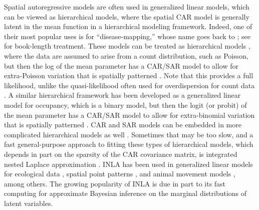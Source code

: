 \documentclass[11pt, titlepage]{article}\usepackage[]{graphicx}\usepackage[]{color}
\begin{document}
\begin{spacing}{1.9}
\begin{flushleft}
Spatial autoregressive models are often used in generalized linear models, which can be viewed as hierarchical models, where the spatial CAR model is generally latent in the mean function in a hierarchical modeling framework. Indeed, one of their most popular uses is for ``disease-mapping,'' whose name goes back to \citet{Clay:Kald:empi:1987}; see \citet{Laws:Baye:2009} for book-length treatment.  These models can be treated as hierarchical models \citep{Cres:Cald:Clar:VerH:acco:2009}, where the data are assumed to arise from a count distribution, such as Poisson, but then the log of the mean parameter has a CAR/SAR model to allow for extra-Poisson variation that is spatially patterned \citep[e.g.,][]{Ver:Jans:spac:2007}.  Note that this provides a full likelihood, unlike the quasi-likelihood often used for overdispersion for count data \citep{Ver:Bove:quas:2007}.  A similar hierarchical framework has been developed as a generalized linear model for occupancy, which is a binary model, but then the logit (or probit) of the mean parameter has a CAR/SAR model to allow for extra-binomial variation that is spatially patterned \citep{Mago:Ray:John:Valk:Daws:Bowm:mode:2007,Gard:Lawl:Ver:Mago:Kell:coar:2010,John:Conn:Hoot:Ray:Pond:spat:2013,Brom:John:Altw:Conq:spat:2014,Pole:Pond:Scha:Brow:Ray:John:occu:2014}.  CAR and SAR models can be embedded in more complicated hierarchical models as well \citep[e.g.,][]{Ver:Came:Bove:Lond:spat:2014}. Sometimes that may be too slow, and a fast general-purpose approach to fitting these types of hierarchical models, which depends in part on the sparsity of the CAR covariance matrix, is integrated nested Laplace approximation \citep[INLA,][]{Rue:Mart:Chop:appr:2009}. INLA has been used in generalized linear models for ecological data \citep[e.g.,][]{Haas:Hoot:Rizz:Meen:fore:2011,Aart:Fieb:Bras:Matt:quan:2013}, spatial point patterns \citep{Illi:Mart:Sorb:Gall:Zunz:Esqu:Trav:fitt:2013}, and animal movement models \citep{John:Hoot:Kuhn:esti:2013}, among others. The growing popularity of INLA is due in part to its fast computing for approximate Bayesian inference on the marginal distributions of latent variables.



\end{flushleft}
\end{spacing}
\end{document}

